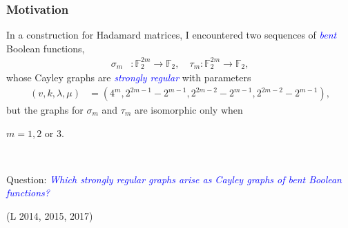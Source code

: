 \documentclass[pdf,sprung,slideColor,nocolorBG]{beamer}
\newenvironment{colortheme}[1]{
\def\ProvidesPackageRCS $##1${\relax}
\renewcommand{\ProcessOptions}{\relax}
\makeatletter

\makeatother
}{}
\newcommand{\slidecite}[1]{\tiny{(#1)}\normalsize{}}
\newcommand{\mb}[1]{\mathbb{#1}}
\newcommand{\Emph}[1]{\emph{\textcolor{blue}{#1}}}
\newcommand{\To}{\rightarrow}
\newcommand{\F}{\mb{F}}
\begin{document}
\begin{colortheme}{jubata}

\begin{frame}
\frametitle{Motivation}

In a construction for Hada\-mard matrices, I encountered
two sequences of \Emph{bent} Boolean functions,
\begin{align*}
\sigma_m &: \F_2^{2m} \To \F_2, \quad \tau_m : \F_2^{2m} \To \F_2,
\end{align*}
whose Cayley graphs are \Emph{strongly regular} with parameters
\begin{align*}
(v,k,\lambda,\mu) &= (4^m, 2^{2 m - 1} - 2^{m-1}, 2^{2 m - 2} - 2^{m-1}, 2^{2 m - 2} - 2^{m-1}),
\end{align*}
but the graphs for $\sigma_m$ and $\tau_m$ are isomorphic only when

$m=1,2$ or $3.$

~

Question: \Emph{Which strongly regular graphs arise as Cayley graphs of bent Boolean functions?}

\slidecite{L 2014, 2015, 2017}
\end{frame}
\end{colortheme}
\end{document}
